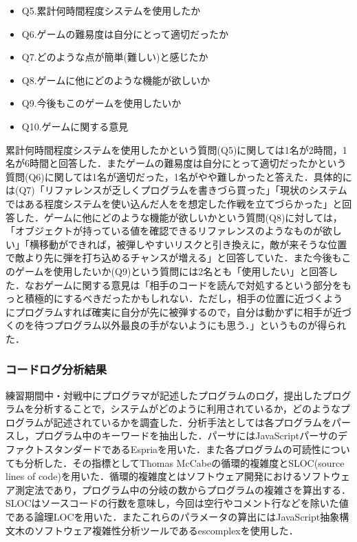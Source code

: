 \begin{itemize}
  \item Q5.累計何時間程度システムを使用したか
  \item Q6.ゲームの難易度は自分にとって適切だったか
  \item Q7.どのような点が簡単(難しい)と感じたか
  \item Q8.ゲームに他にどのような機能が欲しいか
  \item Q9.今後もこのゲームを使用したいか
  \item Q10.ゲームに関する意見
\end{itemize}

累計何時間程度システムを使用したかという質問(Q5)に関しては1名が2時間，1名が6時間と回答した．またゲームの難易度は自分にとって適切だったかという質問(Q6)に関しては1名が適切だった，1名がやや難しかったと答えた．具体的には(Q7)「リファレンスが乏しくプログラムを書きづら買った」「現状のシステムではある程度システムを使い込んだ人をを想定した作戦を立てづらかった」と回答した．ゲームに他にどのような機能が欲しいかという質問(Q8)に対しては，「オブジェクトが持っている値を確認できるリファレンスのようなものが欲しい」「横移動ができれば，被弾しやすいリスクと引き換えに，敵が来そうな位置で敵より先に弾を打ち込めるチャンスが増える」と回答していた．また今後もこのゲームを使用したいか(Q9)という質問には2名とも「使用したい」と回答した．なおゲームに関する意見は「相手のコードを読んで対処するという部分をもっと積極的にするべきだったかもしれない．ただし，相手の位置に近づくようにプログラムすれば確実に自分が先に被弾するので，自分は動かずに相手が近づくのを待つプログラム以外最良の手がないようにも思う．」というものが得られた．

\subsubsection{コードログ分析結果}

練習期間中・対戦中にプログラマが記述したプログラムのログ，提出したプログラムを分析することで，システムがどのように利用されているか，どのようなプログラムが記述されているかを調査した．分析手法としては各プログラムをパースし，プログラム中のキーワードを抽出した．パーサにはJavaScriptパーサのデファクトスタンダードであるEspria\cite{esprima}を用いた．また各プログラムの可読性についても分析した．その指標としてThomas McCabeの循環的複雑度\cite{complexity}とSLOC(source lines of code)を用いた．循環的複雑度とはソフトウェア開発におけるソフトウェア測定法であり，プログラム中の分岐の数からプログラムの複雑さを算出する．SLOCはソースコードの行数を意味し，今回は空行やコメント行などを除いた値である論理LOCを用いた．またこれらのパラメータの算出にはJavaScript抽象構文木のソフトウェア複雑性分析ツールであるescomplex\cite{escomplex}を使用した．

